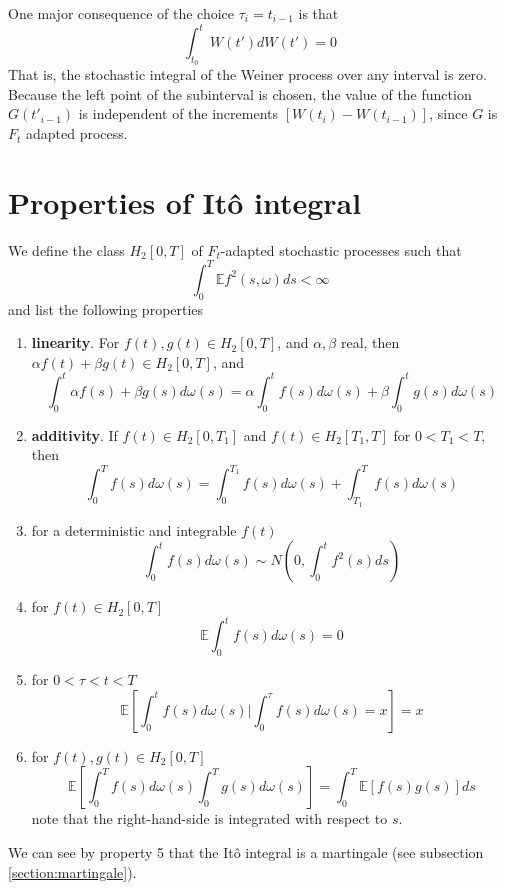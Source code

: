 \documentclass[12pt]{book}
\begin{document}
One major consequence of the choice $\tau_i=t_{i-1}$ is that 
\begin{equation*}
\int_{t_0}^{t}W(t')dW(t')=0
\end{equation*}
That is, the stochastic integral of the Weiner process over any interval is zero.
Because the left point of the subinterval is chosen, the value of the function $G(t'_{i-1})$ is independent of the increments $[W(t_i)-W(t_{i-1})]$, since $G$ is $F_t$ adapted process.

\section{Properties of It\^{o} integral}\label{section:propertiesOfTheItoIntegral}
We define the class $H_2[0,T]$ of $F_t$-adapted stochastic processes such that 
\begin{equation*}
\int_0^T \mathbb{E}f^2(s,\omega)ds <\infty
\end{equation*}
and list the following properties
\begin{enumerate}
\item \textbf{linearity}. For $f(t),g(t)\in H_2[0,T]$, and $\alpha,\beta$ real, then $\alpha f(t)+\beta g(t) \in H_2[0,T]$, and 
\begin{equation*}
\int_0^t \alpha f(s)+\beta g(s) d\omega(s) = \alpha \int_0^t f(s)d\omega(s) +\beta \int_0^t g(s)d\omega(s)
\end{equation*}
\item \textbf{additivity}. If $f(t)\in H_2[0,T_1]$ and $f(t)\in H_2[T_1,T]$ for $0<T_1<T$, then 
\begin{equation*}
\int_0^Tf(s)d\omega(s) = \int_0^{T_1}f(s)d\omega(s) +\int_{T_1}^T f(s)d\omega(s)
\end{equation*}
\item for a deterministic and integrable $f(t)$
\begin{equation*}
\int_0^t f(s)d\omega(s) \sim N\left(0,\int_0^t f^2(s)ds\right)
\end{equation*}
\item for $f(t)\in H_2[0,T]$
\begin{equation*}
\mathbb{E}\int_0^t f(s)d\omega(s) = 0
\end{equation*}
\item for $0<\tau<t<T$  
\begin{equation*}
\mathbb{E}\left[\int_0^t f(s)d\omega(s)  | \int_0^\tau f(s)d\omega(s)=x \right] =x 
\end{equation*}
\item for $f(t),g(t)\in H_2[0,T]$
\begin{equation*}
\mathbb{E}\left[\int_0^Tf(s)d\omega(s)\int_0^T g(s)d\omega(s)\right]=\int_0^T\mathbb{E}[f(s)g(s)]ds
\end{equation*}
note that the right-hand-side is integrated with respect to $s$.
\end{enumerate}
We can see by property 5 that the It\^{o} integral is a martingale (see subsection \ref{section:martingale}).
\end{document}
